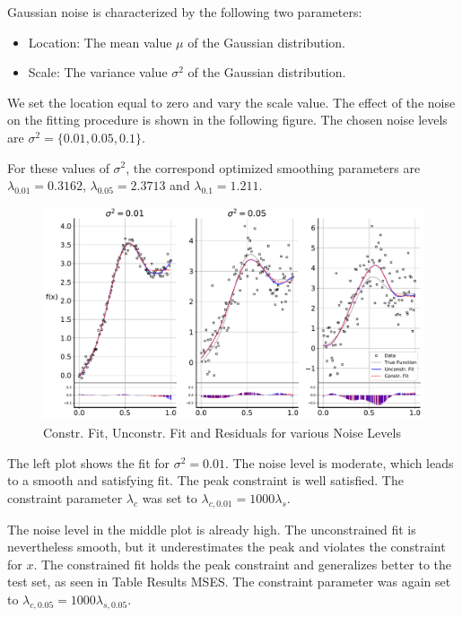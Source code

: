 \documentclass[10pt,a4paper]{article}
\begin{document}
Gaussian noise is characterized by the following two parameters:
\begin{itemize}
	\item Location: The mean value $\mu$ of the Gaussian distribution.
	\item Scale: The variance value $\sigma^2$ of the Gaussian distribution.
\end{itemize}

We set the location equal to zero and vary the scale value. The effect of the noise on the fitting procedure is shown in the following figure. The chosen noise levels are $\sigma^2 = \{0.01, 0.05, 0.1\}$.

For these values of $\sigma^2$, the correspond optimized smoothing parameters are $\lambda_{0.01} = 0.3162$, $\lambda_{0.05} = 2.3713$ and $\lambda_{0.1} = 1.211$.

\begin{figure}[H]
	\centering
	\includegraphics[width=\columnwidth]{../thesisplots/exp_noise_levels.pdf}
	\caption{Constr. Fit, Unconstr. Fit and Residuals for various Noise Levels}
	\label{fig:fit_noise_levels}
\end{figure}

The left plot shows the fit for $\sigma^2 = 0.01$. The noise level is moderate, which leads to a smooth and satisfying fit. The peak constraint is well satisfied. The constraint parameter $\lambda_c$ was set to $\lambda_{c, 0.01} = 1000\lambda_s$. 

The noise level in the middle plot is already high. The unconstrained fit is nevertheless smooth, but it underestimates the peak and violates the constraint for $x$. The constrained fit holds the peak constraint and generalizes better to the test set, as seen in Table Results MSES. The constraint parameter was again set to $\lambda_{c, 0.05} = 1000\lambda_{s, 0.05}.$ 
\end{document}

